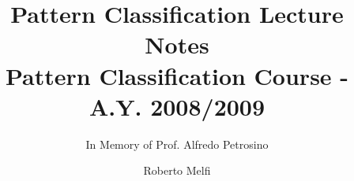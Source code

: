 \documentclass[envcountsame,envcountchap]{svmono}
\begin{document}
\author{Roberto Melfi}
\title{Pattern Classification Lecture Notes\\
{\small Pattern Classification Course - A.Y. 2008/2009}}
\subtitle{In Memory of Prof. Alfredo Petrosino}
\maketitle

\frontmatter%




\tableofcontents


\mainmatter%



%
%




\backmatter%


\printindex

\end{document}
